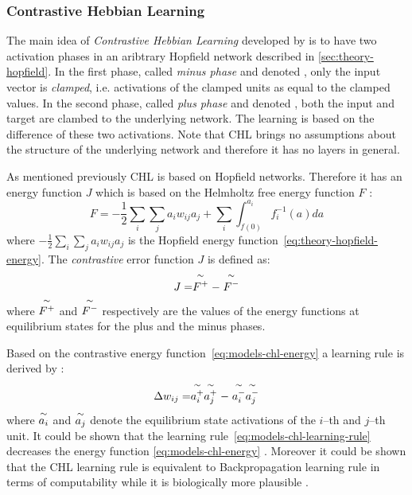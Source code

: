 \def\myover#1#2{\mathrel{\overset{\makebox[0pt]{#2}}{#1}}}
\newcommand{\mytilde}{\raise.17ex\hbox{$\scriptstyle\mathtt{\sim}$}}
\def\myequi#1{\myover{#1}{\mytilde}}

\subsubsection{Contrastive Hebbian Learning}
\label{models-chl} 

The main idea of \emph{Contrastive Hebbian Learning} developed by \citet{movellan1990contrastive} is to have two activation phases in an aribtrary Hopfield network \citep{hopfield1984neurons} described in \ref{sec:theory-hopfield}. In the first phase, called \emph{minus phase} and denoted \quotes{-}, only the input vector is \emph{clamped}, i.e. activations of the clamped units as equal to the clamped values. In the second phase, called \emph{plus phase} and denoted \quotes{+}, both the input and target are clambed to the underlying network. The learning is based on the difference of these two activations. Note that CHL brings no assumptions about the structure of the underlying network and therefore it has no layers in general. 

As mentioned previously CHL is based on Hopfield networks. Therefore it has an energy function $J$ which is based on the Helmholtz free energy function $F$ \citep{hinton1989deterministic}:
\begin{equation}
  \label{eq:models-chl-helmholtz}
  F = -\frac{1}{2}\sum_i\sum_ja_iw_{ij}a_j + \sum_i \int_{f(0)}^{a_i} f_i^{-1}(a)da
\end{equation} 
where $-\frac{1}{2}\sum_i\sum_ja_iw_{ij}a_j$ is the Hopfield energy function~\ref{eq:theory-hopfield-energy}. The \emph{contrastive} error function $J$ is defined as: 
\begin{equation}
  \label{eq:models-chl-energy}
  J = \myequi{F^{+}} - \myequi{F^{-}}
\end{equation} 
where $\myequi{F^{+}}$ and $\myequi{F^{-}}$ respectively are the values of the energy functions at equilibrium states for the plus and the minus phases. 

Based on the contrastive energy function~\ref{eq:models-chl-energy} a learning rule is derived by \citet{movellan1990contrastive}: 
\begin{equation}
  \label{eq:models-chl-learning-rule}
  \Delta w_{ij} = \myequi{a_i^{+}}\myequi{a_j^{+}} - \myequi{a_i^{-}}\myequi{a_j^{-}}
\end{equation}
where $\myequi{a_i}$ and $\myequi{a_j}$ denote the equilibrium state activations of the $i$--th and $j$--th unit. It could be shown that the learning rule~\ref{eq:models-chl-learning-rule} decreases the energy function \ref{eq:models-chl-energy} \citep{movellan1990contrastive}. Moreover it could be shown that the CHL learning rule is equivalent to Backpropagation learning rule in terms of computability while it is biologically more plausible \citep{o1996bio, xie2003equivalence}. 

   
